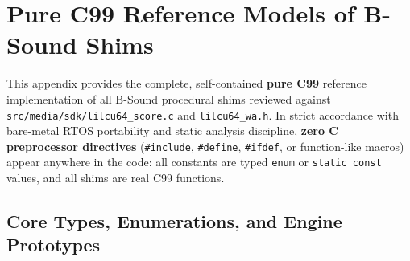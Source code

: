 \chapter{Pure C99 Reference Models of B-Sound Shims}
\label{app:c99-shims}

This appendix provides the complete, self-contained \textbf{pure C99} reference implementation of all B-Sound procedural shims reviewed against \texttt{src/media/sdk/lilcu64\_score.c} and \texttt{lilcu64\_wa.h}. In strict accordance with bare-metal RTOS portability and static analysis discipline, \textbf{zero C preprocessor directives} (\texttt{\#include}, \texttt{\#define}, \texttt{\#ifdef}, or function-like macros) appear anywhere in the code: all constants are typed \texttt{enum} or \texttt{static const} values, and all shims are real C99 functions.

\section{Core Types, Enumerations, and Engine Prototypes}

